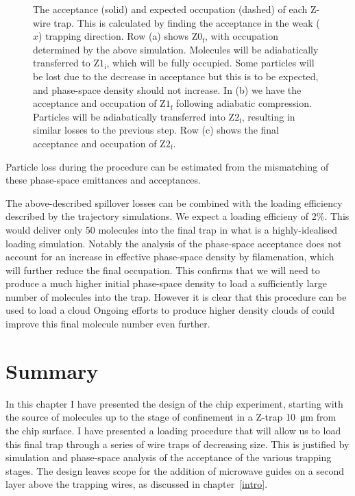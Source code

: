 \begin{figure}[tbhp]
\centering
  \caption{
    The acceptance (solid) and expected occupation (dashed) of each Z-wire
    trap. This is calculated by finding the acceptance in the weak ($x$)
    trapping direction. Row (a) shows $\mathrm{Z0_f}$, with occupation
    determined by the above simulation. Molecules will be adiabatically
    transferred to $\mathrm{Z1_i}$, which will be fully occupied. Some
    particles will be lost due to the decrease in acceptance but this is to be
    expected, and phase-space density should not increase. In (b) we have the
    acceptance and occupation of $\mathrm{Z1_f}$ following adiabatic
    compression.  Particles will be adiabatically transferred into
    $\mathrm{Z2_i}$, resulting in similar losses to the previous step. Row (c)
    shows the final acceptance and occupation of $\mathrm{Z2_f}$.
  }
  \label{sim:fig:phasematchinggrid}
\end{figure}

Particle loss during the procedure can be estimated from the mismatching
of these phase-space emittances and acceptances.

The above-described spillover losses can be combined with the loading efficiency
described by the trajectory simulations. We 
expect a loading efficieny of 2\%. This would deliver only 50 molecules into
the final trap in what is a highly-idealised loading simulation. Notably the
analysis of the phase-space acceptance does not account for an increase in
effective phase-space density by filamenation, which will further reduce the
final occupation. This confirms
that we will need to produce a much higher initial phase-space density to
load a sufficiently large number of molecules into the trap. However it is
clear that this procedure can be used to load a cloud Ongoing efforts to produce higher
density clouds of \CaF{} could improve this final molecule number even further.

\section{Summary}

In this chapter I have presented the design of the chip experiment, starting
with the source of molecules up to the stage of confinement in a Z-trap
\SI{10}{\micro\meter} from the chip surface. I have presented
a loading procedure that will allow us to load this final trap through a series
of wire traps of decreasing size. This is justified by simulation and
phase-space analysis of the acceptance of the various trapping stages.
%
The design leaves scope for the addition of microwave guides on a second layer
above the trapping wires, as discussed in chapter~\ref{intro}.
